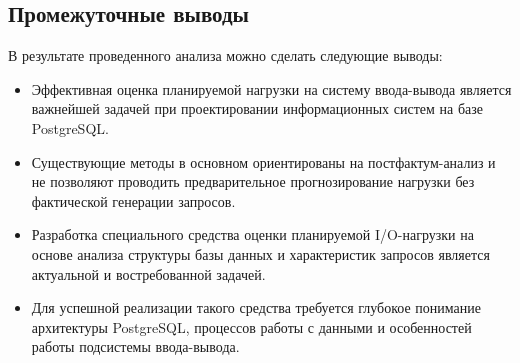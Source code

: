 \subsection{Промежуточные выводы}

В результате проведенного анализа можно сделать следующие выводы:

\begin{itemize}
    \item Эффективная оценка планируемой нагрузки на систему ввода-вывода является важнейшей задачей при проектировании информационных систем на базе PostgreSQL.
    \item Существующие методы в основном ориентированы на постфактум-анализ и не позволяют проводить предварительное прогнозирование нагрузки без фактической генерации запросов.
    \item Разработка специального средства оценки планируемой I/O-нагрузки на основе анализа структуры базы данных и характеристик запросов является актуальной и востребованной задачей.
    \item Для успешной реализации такого средства требуется глубокое понимание архитектуры PostgreSQL, процессов работы с данными и особенностей работы подсистемы ввода-вывода.
\end{itemize}



